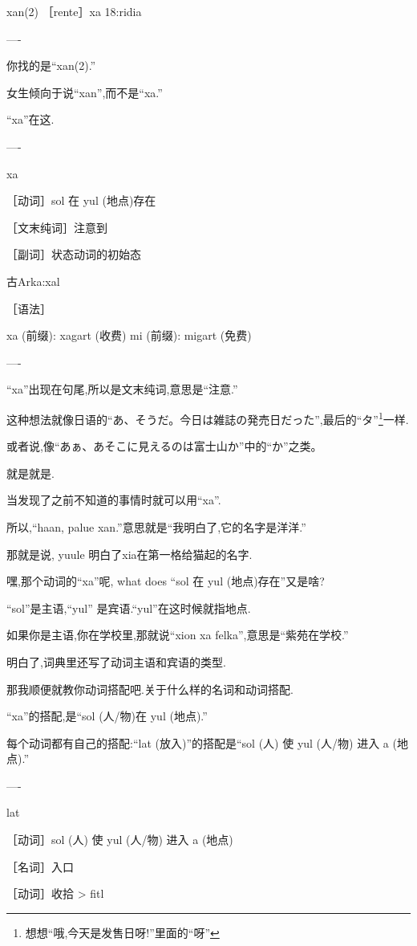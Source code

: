 xan(2)
［rente］xa
18:ridia

----

你找的是``xan(2).''

女生倾向于说``xan'',而不是``xa.''

``xa''在这.

----

xa

［动词］sol 在 yul (地点)存在

［文末纯词］注意到

［副词］状态动词的初始态

古Arka:xal

［语法］

xa (前缀): xagart (收费) 
mi (前缀): migart (免费) 

----

``xa''出现在句尾,所以是文末纯词,意思是``注意.''

这种想法就像日语的``あ、そうだ。今日は雑誌の発売日だった'',最后的``タ''\footnote{想想``哦,今天是发售日呀!''里面的``呀''}一样.

或者说,像``あぁ、あそこに見えるのは富士山か''中的``か''之类。
 

就是就是.

当发现了之前不知道的事情时就可以用``xa''.

    
所以,``haan, palue xan.''意思就是``我明白了,它的名字是洋洋.''

那就是说, yuule 明白了xia在第一格给猫起的名字.

嘿,那个动词的``xa''呢, what does ``sol 在 yul (地点)存在''又是啥?


``sol''是主语,``yul'' 是宾语.``yul''在这时候就指地点.

如果你是主语,你在学校里,那就说``xion xa felka'',意思是``紫苑在学校.''


明白了,词典里还写了动词主语和宾语的类型.


那我顺便就教你动词搭配吧.关于什么样的名词和动词搭配.

``xa''的搭配,是``sol (人/物)在 yul (地点).''

每个动词都有自己的搭配:``lat (放入)''的搭配是``sol (人) 使 yul (人/物) 进入 a (地点).''

----

lat

［动词］sol (人) 使 yul (人/物) 进入 a (地点)

［名词］入口

［动词］收拾 > fitl

